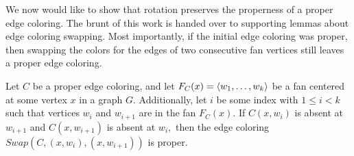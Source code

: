 We now would like to show that rotation preserves the properness of a proper edge coloring. The brunt of this work is handed over to supporting lemmas about edge coloring swapping. Most importantly, if the initial edge coloring was proper, then swapping the colors for the edges of two consecutive fan vertices still leaves a proper edge coloring.
\begin{lemma}\label{swap_proper}
    Let $C$ be a proper edge coloring, and let $F_C(x) = \langle w_1, \dots, w_k\rangle$ be a fan centered at some vertex $x$ in a graph $G.$ Additionally, let $i$ be some index with $1 \leq i < k$ such that vertices $w_i$ and $w_{i+1}$ are in the fan $F_C(x).$ If $C(x, w_i)$ is absent at $w_{i+1}$ and $C(x,w_{i+1})$ is absent at $w_i,$ then the edge coloring $Swap(C, (x, w_i), (x, w_{i+1}))$ is proper.
\end{lemma}
